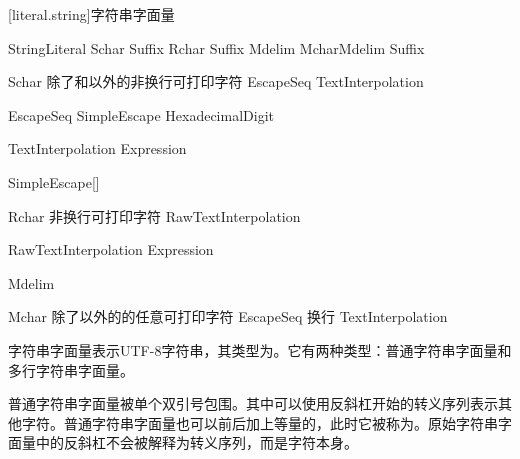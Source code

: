 [literal.string]{字符串字面量}

\begin{bnf}{StringLiteral}
     Schar\bnfs {} Suffix\bnfq \br
    \bnfp {} Rchar\bnfs {} \bnfp Suffix\bnfq \br
    Mdelim Mchar\bnfs Mdelim Suffix\bnfq
\end{bnf}

\begin{bnf}{Schar}
    \textnormal{除了\terminal{\textbackslash}和以外的非换行可打印字符} \br
    EscapeSeq \br
    TextInterpolation
\end{bnf}

\begin{bnf}{EscapeSeq}
    \terminal{\textbackslash} SimpleEscape \br
     HexadecimalDigit\bnfp \terminal{\}}
\end{bnf}

\begin{bnf}{TextInterpolation}
    \terminal{\textbackslash{}(} Expression \terminal{)}
\end{bnf}

\begin{bnf}{SimpleEscape}[\oneof]
\end{bnf}

\begin{bnf}{Rchar}
    \textnormal{非换行可打印字符} \br
    RawTextInterpolation
\end{bnf}

\begin{bnf}{RawTextInterpolation}
    \terminal{\textbackslash} \bnfp \terminal{(}  Expression \terminal{)}
\end{bnf}

\begin{bnf}{Mdelim}
     \bnfs
\end{bnf}

\begin{bnf}{Mchar}
    \textnormal{除了\terminal{\textbackslash}以外的的任意可打印字符} \br
    EscapeSeq \br
    \terminal{\textbackslash} \textnormal{换行} \br
    TextInterpolation
\end{bnf}

\pnum
字符串字面量表示UTF-8字符串，其类型为。它有两种类型：普通字符串字面量和多行字符串字面量。

\pnum
普通字符串字面量被单个双引号包围。其中可以使用反斜杠开始的转义序列表示其他字符。普通字符串字面量也可以前后加上等量的，此时它被称为。原始字符串字面量中的反斜杠不会被解释为转义序列，而是字符本身。

